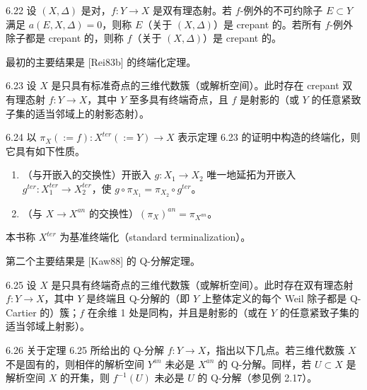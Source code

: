 \begin{definition}[{[Rei83b]}]{6.22}
设 $(X,\Delta)$ 是对，$f:Y\to X$ 是双有理态射。若 $f$-例外的不可约除子 $E\subset Y$ 满足 $a(E,X,\Delta)=0$，则称 $E$（关于 $(X,\Delta)$）是 crepant 的。若所有 $f$-例外除子都是 crepant 的，则称 $f$（关于 $(X,\Delta)$）是 crepant 的。
\end{definition}

最初的主要结果是 [Rei83b] 的终端化定理。

\begin{theorem*}{6.23}
设 $X$ 是只具有标准奇点的三维代数簇（或解析空间）。此时存在 crepant 双有理态射 $f:Y\to X$，其中 $Y$ 至多具有终端奇点，且 $f$ 是射影的（或 $Y$ 的任意紧致子集的适当邻域上的射影态射）。
\end{theorem*}

\begin{remark}{6.24}
以 $\pi_X(:=f):X^{ter}(:=Y)\to X$ 表示定理 6.23 的证明中构造的终端化，则它具有如下性质。
\begin{enumerate}[label=（\arabic*）,leftmargin=3.2em]
\item （与开嵌入的交换性）开嵌入 $g:X_1\to X_2$ 唯一地延拓为开嵌入 $g^{ter}:X_1^{ter}\to X_2^{ter}$，使 $g\circ\pi_{X_1}=\pi_{X_2}\circ g^{ter}$。
\item （与 $X\to X^{an}$ 的交换性）$(\pi_X)^{an}=\pi_{X^{an}}$。
\end{enumerate}
本书称 $X^{ter}$ 为基准终端化（standard terminalization）。
\end{remark}


第二个主要结果是 [Kaw88] 的 Q-分解定理。

\begin{theorem*}[Q-分解（Q-factorialization）]{6.25}
设 $X$ 是只具有终端奇点的三维代数簇（或解析空间）。此时存在双有理态射 $f:Y\to X$，其中 $Y$ 是终端且 Q-分解的（即 $Y$ 上整体定义的每个 Weil 除子都是 Q-Cartier 的）簇；$f$ 在余维 1 处是同构，并且是射影的（或在 $Y$ 的任意紧致子集的适当邻域上射影）。
\end{theorem*}


\begin{remark}{6.26}
关于定理 6.25 所给出的 Q-分解 $f:Y\to X$，指出以下几点。若三维代数簇 $X$ 不是固有的，则相伴的解析空间 $Y^{an}$ 未必是 $X^{an}$ 的 Q-分解。同样，若 $U\subset X$ 是解析空间 $X$ 的开集，则 $f^{-1}(U)$ 未必是 $U$ 的 Q-分解（参见例 2.17）。
\end{remark}

